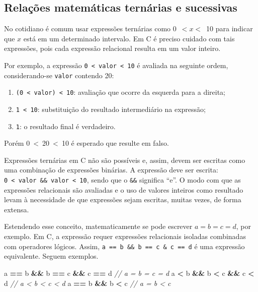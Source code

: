 \documentclass[
  11pt,
  a4paper,
]{scrbook}
\newenvironment{Shaded}{\begin{snugshade}}{\end{snugshade}}
\newcommand{\CommentTok}[1]{\textcolor[rgb]{0.56,0.35,0.01}{\textit{#1}}}
\newcommand{\NormalTok}[1]{#1}
\newcommand{\OperatorTok}[1]{\textcolor[rgb]{0.81,0.36,0.00}{\textbf{#1}}}
\providecommand{\tightlist}{%
  \setlength{\itemsep}{0pt}\setlength{\parskip}{0pt}}\usepackage{longtable,booktabs,array}
\begin{document}
\subsection{Relações matemáticas ternárias e
sucessivas}\label{sec-relacoes-ternarias}

No cotidiano é comum usar expressões ternárias como 0~\(< x <\)~10 para
indicar que \(x\) está em um determinado intervalo. Em C é preciso
cuidado com tais expressões, pois cada expressão relacional resulta em
um valor inteiro.

Por exemplo, a expressão \texttt{0\ \textless{}\ valor\ \textless{}\ 10}
é avaliada na seguinte ordem, considerando-se \texttt{valor} contendo
20:

\begin{enumerate}
\tightlist
\item
  \texttt{(0\ \textless{}\ valor)\ \textless{}\ 10}: avaliação que
  ocorre da esquerda para a direita;
\item
  \texttt{1\ \textless{}\ 10}: substituição do resultado intermediário
  na expressão;
\item
  \texttt{1}: o resultado final é verdadeiro.
\end{enumerate}

Porém 0~\textless~20~\textless~10 é esperado que resulte em falso.

Expressões ternárias em C não são possíveis e, assim, devem ser escritas
como uma combinação de expressões binárias. A expressão deve ser
escrita: \texttt{0\ \textless{}\ valor\ \&\&\ valor\ \textless{}\ 10},
sendo que o \texttt{\&\&} significa ``e''. O modo com que as expressões
relacionais são avaliadas e o uso de valores inteiros como resultado
levam à necessidade de que expressões sejam escritas, muitas vezes, de
forma extensa.

Estendendo esse conceito, matematicamente se pode escrever
\(a = b = c = d\), por exemplo. Em C, a expressão requer expressões
relacionais isoladas combinadas com operadores lógicos. Assim,
\texttt{a\ ==\ b\ \&\&\ b\ ==\ c\ \&\ c\ ==\ d} é uma expressão
equivalente. Seguem exemplos.

\begin{Shaded}
\begin{Highlighting}[]
\NormalTok{a }\OperatorTok{==}\NormalTok{ b }\OperatorTok{\&\&}\NormalTok{ b }\OperatorTok{==}\NormalTok{ c }\OperatorTok{\&\&}\NormalTok{ c }\OperatorTok{==}\NormalTok{ d  }\CommentTok{// a = b = c = d}
\NormalTok{a }\OperatorTok{\textless{}}\NormalTok{ b }\OperatorTok{\&\&}\NormalTok{ b }\OperatorTok{\textless{}}\NormalTok{ c }\OperatorTok{\&\&}\NormalTok{ c }\OperatorTok{\textless{}}\NormalTok{ d     }\CommentTok{// a \textless{} b \textless{} c \textless{} d}
\NormalTok{a }\OperatorTok{==}\NormalTok{ b }\OperatorTok{\&\&}\NormalTok{ b }\OperatorTok{\textless{}}\NormalTok{ c             }\CommentTok{// a = b \textless{} c}
\end{Highlighting}
\end{Shaded}
\end{document}
